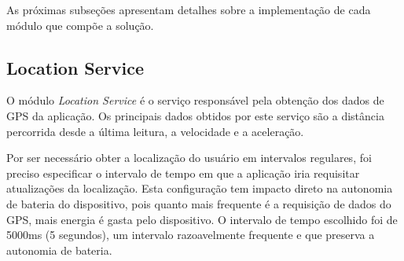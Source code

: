 As próximas subseções apresentam detalhes sobre a implementação de cada módulo que compõe a solução.

\subsection{Location Service}
\label{location-service}

O módulo \textit{Location Service} é o serviço responsável pela obtenção dos dados de GPS da aplicação. Os principais dados obtidos
por este serviço são a distância percorrida desde a última leitura, a velocidade e a aceleração.

Por ser necessário obter a localização do usuário em intervalos regulares, foi preciso especificar o intervalo de tempo em que a
aplicação iria requisitar atualizações da localização. Esta configuração tem impacto direto na autonomia de bateria do dispositivo,
pois quanto mais frequente é a requisição de dados do GPS, mais energia é gasta pelo dispositivo. O intervalo
de tempo escolhido foi de 5000ms (5 segundos), um intervalo razoavelmente frequente e que preserva a autonomia de bateria.
